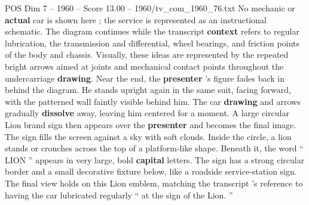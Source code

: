 \begin{textsample}{POS Dim 7 – 1960 – Score 13.00 – 1960/tv\_com\_1960\_76.txt}
No mechanic or \textbf{actual} car is shown here ; the service is represented as an instructional schematic.
The diagram continues while the transcript \textbf{context} refers to regular lubrication, the transmission and differential, wheel bearings, and friction points of the body and chassis.
Visually, these ideas are represented by the repeated bright arrows aimed at joints and mechanical contact points throughout the undercarriage \textbf{drawing}.
Near the end, the \textbf{presenter} ’s figure fades back in behind the diagram.
He stands upright again in the same suit, facing forward, with the patterned wall faintly visible behind him.
The car \textbf{drawing} and arrows gradually \textbf{dissolve} away, leaving him centered for a moment.
A large circular Lion brand sign then appears over the \textbf{presenter} and becomes the final image.
The sign fills the screen against a sky with soft clouds.
Inside the circle, a lion stands or crouches across the top of a platform-like shape.
Beneath it, the word “ LION ” appears in very large, bold \textbf{capital} letters.
The sign has a strong circular border and a small decorative fixture below, like a roadside service-station sign.
The final view holds on this Lion emblem, matching the transcript ’s reference to having the car lubricated regularly “ at the sign of the Lion. ”

\end{textsample}
